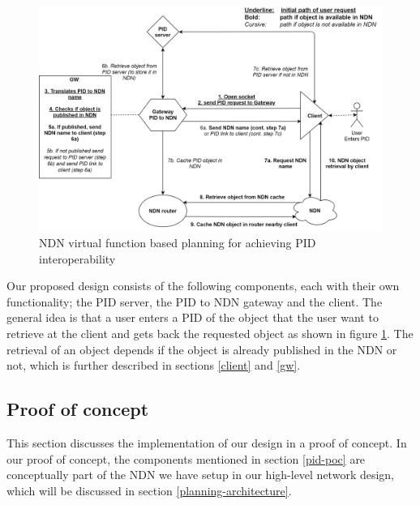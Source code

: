 \begin{figure}[H]
\centering
\includegraphics[width=\textwidth]{Images/PIDtoNDN11.png}
\caption{NDN virtual function based 
planning for achieving PID interoperability}
\label{fig:sdc_model}
\end{figure}

Our proposed design consists of the following components, each with their own functionality; the PID server, the PID to NDN gateway and the client. The general idea is that a user enters a PID of the object that the user want to retrieve at the client and gets back the requested object as shown in figure \ref{fig:sdc_model}. The retrieval of an object depends if the object is already published in the NDN or not, which is further described in sections \ref{client} and \ref{gw}.

\subsection{Proof of concept} 
This section discusses the implementation of our design in a proof of concept.
In our proof of concept, the components mentioned in section \ref{pid-poc} are conceptually part of the NDN we have setup in our high-level network design, which will be discussed in section \ref{planning-architecture}.

